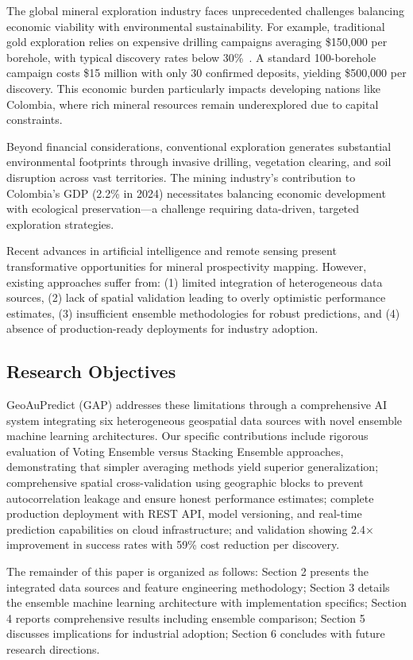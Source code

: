 \documentclass[12pt,a4paper]{article}
\begin{document}
The global mineral exploration industry faces unprecedented challenges balancing economic viability with environmental sustainability. For example, traditional gold exploration relies on expensive drilling campaigns averaging \$150,000 per borehole, with typical discovery rates below 30\%~\citep{colombian_gold}. A standard 100-borehole campaign costs \$15 million with only 30 confirmed deposits, yielding \$500,000 per discovery. This economic burden particularly impacts developing nations like Colombia, where rich mineral resources remain underexplored due to capital constraints.

Beyond financial considerations, conventional exploration generates substantial environmental footprints through invasive drilling, vegetation clearing, and soil disruption across vast territories. The mining industry's contribution to Colombia's GDP (2.2\% in 2024) necessitates balancing economic development with ecological preservation—a challenge requiring data-driven, targeted exploration strategies.

Recent advances in artificial intelligence and remote sensing present transformative opportunities for mineral prospectivity mapping. However, existing approaches suffer from: (1) limited integration of heterogeneous data sources, (2) lack of spatial validation leading to overly optimistic performance estimates, (3) insufficient ensemble methodologies for robust predictions, and (4) absence of production-ready deployments for industry adoption.

\subsection{Research Objectives}

GeoAuPredict (GAP) addresses these limitations through a comprehensive AI system integrating six heterogeneous geospatial data sources with novel ensemble machine learning architectures. Our specific contributions include rigorous evaluation of Voting Ensemble versus Stacking Ensemble approaches, demonstrating that simpler averaging methods yield superior generalization; comprehensive spatial cross-validation using geographic blocks to prevent autocorrelation leakage and ensure honest performance estimates; complete production deployment with REST API, model versioning, and real-time prediction capabilities on cloud infrastructure; and validation showing 2.4× improvement in success rates with 59\% cost reduction per discovery.

The remainder of this paper is organized as follows: Section 2 presents the integrated data sources and feature engineering methodology; Section 3 details the ensemble machine learning architecture with implementation specifics; Section 4 reports comprehensive results including ensemble comparison; Section 5 discusses implications for industrial adoption; Section 6 concludes with future research directions.
\end{document}
